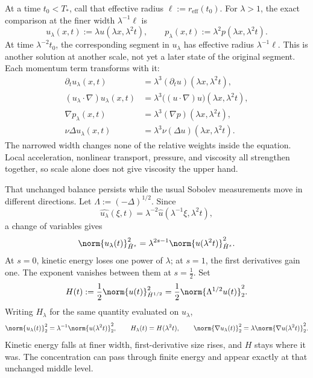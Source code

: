 
At a time \(t_0<T_*\), call that effective radius \(\ell:=r_{\mathrm{eff}}(t_0)\). For \(\lambda>1\), the exact \NavierStokes{} comparison at the finer width \(\lambda^{-1}\ell\) is
\[
  u_\lambda(x,t)
  :=
  \lambda u(\lambda x,\lambda^2t),
  \qquad
  p_\lambda(x,t)
  :=
  \lambda^2p(\lambda x,\lambda^2t).
\]
At time \(\lambda^{-2}t_0\), the corresponding segment in \(u_\lambda\) has effective radius \(\lambda^{-1}\ell\). This is another solution at another scale, not yet a later state of the original segment. Each momentum term transforms with it:
\[
\begin{aligned}
  \partial_tu_\lambda(x,t)
  &=
  \lambda^3(\partial_tu)(\lambda x,\lambda^2t),
  \\
  (u_\lambda\cdot\nabla)u_\lambda(x,t)
  &=
  \lambda^3\bigl((u\cdot\nabla)u\bigr)(\lambda x,\lambda^2t),
  \\
  \nabla p_\lambda(x,t)
  &=
  \lambda^3(\nabla p)(\lambda x,\lambda^2t),
  \\
  \nu\Delta u_\lambda(x,t)
  &=
  \lambda^3\nu(\Delta u)(\lambda x,\lambda^2t).
\end{aligned}
\]
The narrowed width changes none of the relative weights inside the equation. Local acceleration, nonlinear transport, pressure, and viscosity all strengthen together, so scale alone does not give viscosity the upper hand.


That unchanged balance persists while the usual Sobolev measurements move in different directions. Let \(\Lambda:=(-\Delta)^{1/2}\). Since
\[
  \widehat{u_\lambda}(\xi,t)
  =
  \lambda^{-2}\widehat u(\lambda^{-1}\xi,\lambda^2t),
\]
a change of variables gives
\[
  \norm{u_\lambda(t)}_{\dot H^s}^2
  =
  \lambda^{2s-1}
  \norm{u(\lambda^2t)}_{\dot H^s}^2.
\]
At \(s=0\), kinetic energy loses one power of \(\lambda\); at \(s=1\), the first derivatives gain one. The exponent vanishes between them at \(s=\tfrac12\). Set
\[
  H(t)
  :=
  \frac12\norm{u(t)}_{\dot H^{1/2}}^2
  =
  \frac12\norm{\Lambda^{1/2}u(t)}_2^2.
\]
Writing \(H_\lambda\) for the same quantity evaluated on \(u_\lambda\),
\[
  \norm{u_\lambda(t)}_2^2
  =
  \lambda^{-1}\norm{u(\lambda^2t)}_2^2,
  \qquad
  H_\lambda(t)=H(\lambda^2t),
  \qquad
  \norm{\nabla u_\lambda(t)}_2^2
  =
  \lambda\norm{\nabla u(\lambda^2t)}_2^2.
\]
Kinetic energy falls at finer width, first-derivative size rises, and \(H\) stays where it was. The concentration can pass through finite energy and appear exactly at that unchanged middle level.

